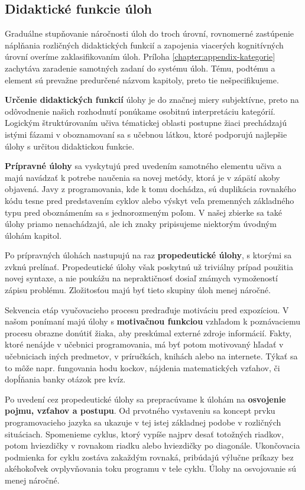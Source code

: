 \subsection{Didaktické funkcie úloh}
Graduálne stupňovanie náročnosti úloh do troch úrovní, rovnomerné zastúpenie náplňania rozličných didaktických funkcií a zapojenia viacerých kognitívných úrovní overíme zaklasifikovaním úloh. Príloha \ref{chapter:appendix-kategorie} zachytáva zaradenie samotných zadaní do systému úloh. Tému, podtému a element sú prevažne predurčené názvom kapitoly, preto tie nešpecifikujeme. 

\textbf{Určenie didaktických funkcií} úlohy je do značnej miery subjektívne, preto na odôvodnenie našich rozhodnutí ponúkame osobitnú interpretáciu kategórií. Logickým štruktúrovaním učiva tématickej oblasti postupne žiaci prechádzajú istými fázami v oboznamovaní sa s učebnou látkou, ktoré podporujú najlepšie úlohy s určitou didaktickou funkcie. 

\textbf{Prípravné úlohy} sa vyskytujú pred uvedením samotného elementu učiva a majú navádzať k potrebe naučenia sa novej metódy, ktorá je v zápätí akoby objavená. Javy z programovania, kde k tomu dochádza, sú duplikácia rovnakého kódu tesne pred predstavením cyklov alebo výskyt veľa premenných základného typu pred oboznámením sa s jednorozmeným poľom. V našej zbierke sa také úlohy priamo nenachádzajú, ale ich znaky pripisujeme niektorým úvodným úlohám kapitol. 

Po prípravných úlohách nastupujú na raz \textbf{propedeutické úlohy}, s ktorými sa zvknú prelínať. Propedeutické úlohy však poskytnú už triviálny prípad použitia novej syntaxe, a nie poukážu na nepraktičnosť dosiaľ známych vymožeností zápisu problému. Zložitosťou majú byť tieto skupiny úloh menej náročné.

Sekvencia etáp vyučovacieho procesu predraďuje motiváciu pred expozíciou. V našom ponímaní majú úlohy s \textbf{motivačnou funkciou} vzhľadom k poznávaciemu procesu obrazne donútiť žiaka, aby preskúmal externé zdroje informácií. Fakty, ktoré nenájde v učebnici programovania, má byť potom motivovaný hľadať v učebniciach iných predmetov, v príručkách, knihách alebo na internete. Týkať sa to môže napr. fungovania hodu kockov, nájdenia matematických vzťahov, či dopĺňania banky otázok pre kvíz.

Po uvedení cez propedeutické úlohy sa prepracúvame k úlohám na \textbf{osvojenie pojmu, vzťahov a postupu}. Od prvotného vystaveniu sa koncept prvku programovacieho jazyka sa
ukazuje v tej istej základnej podobe v rozličných situáciach. Spomenieme cyklus, ktorý vypíše najprv desať totožných riadkov, potom hviezdičky v rovnakom riadku alebo hviezdičky po diagonále. Ukončovacia podmienka for cyklu zostáva zakaždým rovnaká, pribúdajú výlučne príkazy bez akéhokoľvek ovplyvňovania toku programu v tele cyklu. Úlohy na osvojovanie sú menej náročné. 

